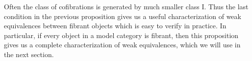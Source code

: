 \documentclass{amsart}
\makeatletter
\theoremstyle{definition}
\newcommand{\cat}[1]{\mathbf{#1}}
\newcommand{\C}{\cat{C}}
\newcommand{\I}{\mathrm{I}}
\newcommand{\cyli}{i}
\newcommand{\po}[1][dr]{\save*!/#1+1.2pc/#1:(1,-1)@^{|-}\restore}
\makeatother
\begin{document}
Often the class of cofibrations is generated by much smaller class $\I$.
Thus the last condition in the previous proposition gives us a useful characterization of weak equivalences between fibrant objects which is easy to verify in practice.
In particular, if every object in a model category is fibrant, then this proposition gives us a complete characterization of weak equivalences, which we will use in the next section.

\begin{comment}
Let $\C$ be a category and let $i : U \to V$ be a morphism of $\C$.
A \emph{system of cylinders} for $i$ consists of the following data:
a relative cylinder object $C_U(V)$, cylinder objects $C(U)$ and $C(V)$, and a morphism of cylinder objects $C(i) : C(U) \to C(V)$
which satisfy the following conditions:
\begin{enumerate}
\item \label{it:comp} For every $i : U \to V$ in $\I$, we have a lift in the following diagram:
\[ \xymatrix{ & V \amalg_U V \ar[r]^{[\cyli_0,\cyli_1]} \ar[d]_{\cyli_0 \amalg_{\cyli_0} \cyli_0} & C_U(V) \ar[d] \\
              V \amalg_U V \ar[r]^-{\cyli_1 \amalg_{\cyli_1} \cyli_1} \ar[d]_{[\cyli_1,\cyli_0]} & C(V) \amalg_{C(U)} C(V) \ar[r] & \po C(V) \amalg_{C(U)} C(V) \amalg_{V \amalg_U V} C_U(V) \\
              C_U(V) \ar@{-->}[urr]
            } \]
\item \label{it:hep-left} For every $u : U \to X$, $v : V \to X$ and homotopy $h : C(U) \to X$ between $u$ and $v \circ i$,
there exists a map $v' : V \to X$ and a homotopy $h' : C(V) \to X$ between $v'$ and $v$
such that $u = v' \circ i$ and $h' \circ C(i) = h$.
\item \label{it:hep-right} For every $u : U \to X$, $v : V \to X$ and homotopy $h : C(U) \to X$ between $v \circ i$ and $u$,
there exists a map $v' : V \to X$ and a homotopy $h' : C(V) \to X$ between $v$ and $v'$
such that $u = v' \circ i$ and $h' \circ C(i) = h$.
\end{enumerate}
The last two conditions are called \emph{the homotopy extension properties} of the system of cylinders.


\end{comment}
\end{document}
